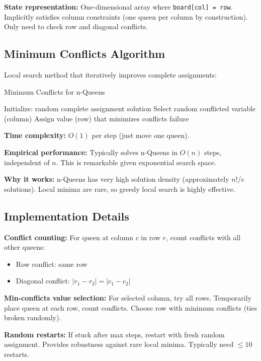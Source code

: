 \documentclass[letterpaper]{article}
\begin{document}
\textbf{State representation:} One-dimensional array where \texttt{board[col] = row}. Implicitly satisfies column constraints (one queen per column by construction). Only need to check row and diagonal conflicts.

\subsection{Minimum Conflicts Algorithm}

Local search method that iteratively improves complete assignments:

\begin{algorithm}[h]
\caption{Minimum Conflicts for n-Queens}
\begin{algorithmic}[1]
\STATE Initialize: random complete assignment
\RETURN solution
\ENDIF
\STATE Select random conflicted variable (column)
\STATE Assign value (row) that minimizes conflicts
\ENDFOR
\RETURN failure
\end{algorithmic}
\end{algorithm}

\textbf{Time complexity:} $O(1)$ per step (just move one queen).

\textbf{Empirical performance:} Typically solves n-Queens in $O(n)$ steps, independent of $n$. This is remarkable given exponential search space.

\textbf{Why it works:} n-Queens has very high solution density (approximately $n!/e$ solutions). Local minima are rare, so greedy local search is highly effective.

\subsection{Implementation Details}

\textbf{Conflict counting:} For queen at column $c$ in row $r$, count conflicts with all other queens:
\begin{itemize}
\item Row conflict: same row
\item Diagonal conflict: $|r_1 - r_2| = |c_1 - c_2|$
\end{itemize}

\textbf{Min-conflicts value selection:} For selected column, try all rows. Temporarily place queen at each row, count conflicts. Choose row with minimum conflicts (ties broken randomly).

\textbf{Random restarts:} If stuck after max steps, restart with fresh random assignment. Provides robustness against rare local minima. Typically need $\leq 10$ restarts.
\end{document}
